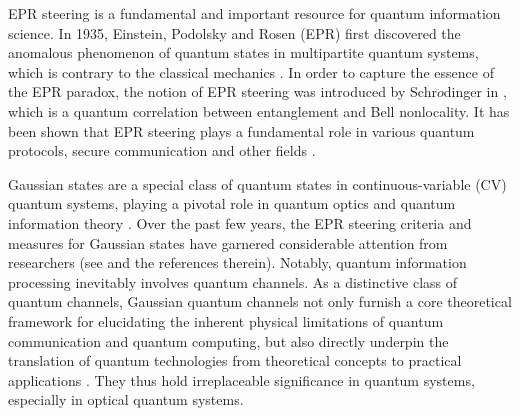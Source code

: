 \documentclass[10pt,aps,pra,amsfonts,amssymb,amsmath,%
floatfix,nofootinbib, groupedaddress,superscriptaddress,citesort,twocolumn
]{revtex4}%
\begin{document}
EPR steering is a fundamental and  important resource for quantum information science.
In 1935, Einstein, Podolsky and Rosen (EPR) first discovered the
anomalous phenomenon of quantum states in  multipartite quantum systems, which
is contrary to the classical mechanics \cite{EPR}. In order to
capture the essence of the EPR paradox, the notion of EPR steering
was  introduced by Schr$\ddot{o}$dinger  in \cite{S}, which is  a quantum correlation between entanglement and Bell
nonlocality. It has been shown that EPR steering plays a fundamental role in
various quantum protocols, secure communication and other fields
\cite{CGP,D1,hq}.


Gaussian states are a special class of quantum states in continuous-variable (CV) quantum systems, playing a pivotal role in quantum optics and quantum information theory \cite{SLP,WPG1,S1}. Over the past few years, the EPR steering criteria and measures for Gaussian states have garnered considerable attention from researchers (see \cite{JiL,KSA,KLRA,ZYL,TGRF,MKIB,BJC,YHQ} and the references therein).
Notably, quantum information processing inevitably involves quantum channels. As a distinctive class of quantum channels, Gaussian quantum channels not only furnish a core theoretical framework for elucidating the inherent physical limitations of quantum communication and quantum computing, but also directly underpin the translation of quantum technologies from theoretical concepts to practical applications \cite{BSS,MDG,CEGH,CD,NGA,LD,PMGH}. They thus hold irreplaceable significance in quantum systems, especially in optical quantum systems.
\end{document}
